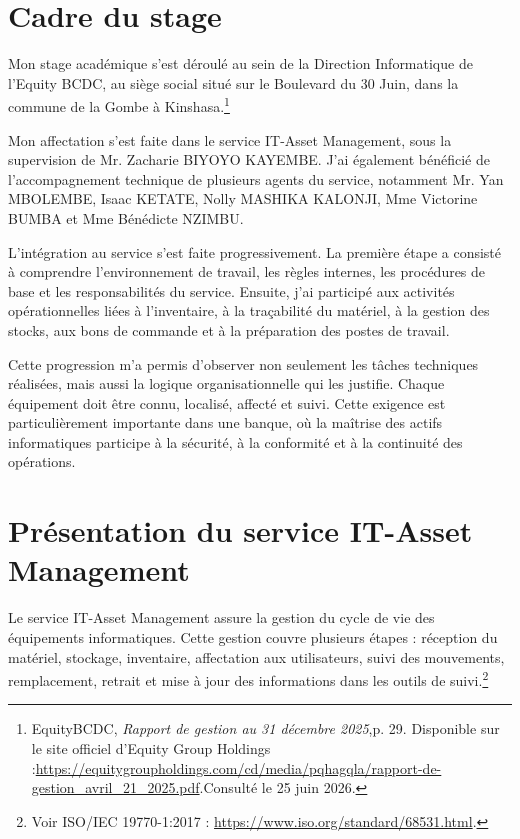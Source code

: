 \documentclass[12pt,a4paper]{report}
\begin{document}
\section{Cadre du stage}

Mon stage académique s'est déroulé au sein de la Direction Informatique de l'Equity BCDC, au siège social situé sur le Boulevard du 30 Juin, dans la commune de la Gombe à Kinshasa.\footnote{EquityBCDC, \textit{Rapport de gestion au 31 décembre 2025},p. 29. Disponible sur le site officiel d'Equity Group Holdings :\url{https://equitygroupholdings.com/cd/media/pqhagqla/rapport-de-gestion_avril_21_2025.pdf}.Consulté le 25 juin 2026.}

Mon affectation s'est faite dans le service IT-Asset Management, sous la supervision de Mr. Zacharie BIYOYO KAYEMBE. J'ai également bénéficié de l'accompagnement technique de plusieurs agents du service, notamment Mr. Yan MBOLEMBE, Isaac KETATE, Nolly MASHIKA KALONJI, Mme Victorine BUMBA et Mme Bénédicte NZIMBU.

L'intégration au service s'est faite progressivement. La première étape a consisté à comprendre l'environnement de travail, les règles internes, les procédures de base et les responsabilités du service. Ensuite, j'ai participé aux activités opérationnelles liées à l'inventaire, à la traçabilité du matériel, à la gestion des stocks, aux bons de commande et à la préparation des postes de travail.

Cette progression m'a permis d'observer non seulement les tâches techniques réalisées, mais aussi la logique organisationnelle qui les justifie. Chaque équipement doit être connu, localisé, affecté et suivi. Cette exigence est particulièrement importante dans une banque, où la maîtrise des actifs informatiques participe à la sécurité, à la conformité et à la continuité des opérations.

\section{Présentation du service IT-Asset Management}

Le service IT-Asset Management assure la gestion du cycle de vie des équipements informatiques. Cette gestion couvre plusieurs étapes : réception du matériel, stockage, inventaire, affectation aux utilisateurs, suivi des mouvements, remplacement, retrait et mise à jour des informations dans les outils de suivi.\footnote{Voir ISO/IEC 19770-1:2017 : \url{https://www.iso.org/standard/68531.html}.}
\end{document}
